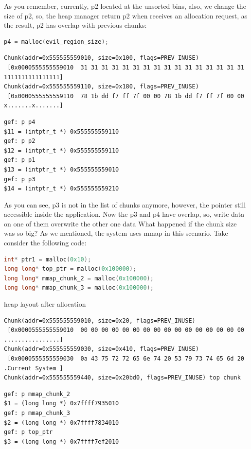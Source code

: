 \documentclass{masterthesis}
\newcommand*\ub{unsorted bins}
\begin{document}
As you remember, currently, p2 located at the \ub{}, also, we change the size of p2, so, the heap manager return p2 when receives an allocation request, as the result, p2 has overlap with previous chunks:

\begin{lstlisting}[language=c,frame=tlrb]
p4 = malloc(evil_region_size);
 \end{lstlisting}

\begin{lstlisting}[frame=tlrb]
Chunk(addr=0x555555559010, size=0x100, flags=PREV_INUSE)
 [0x0000555555559010  31 31 31 31 31 31 31 31 31 31 31 31 31 31 31 31 1111111111111111]
Chunk(addr=0x555555559110, size=0x180, flags=PREV_INUSE)
 [0x0000555555559110  78 1b dd f7 ff 7f 00 00 78 1b dd f7 ff 7f 00 00 x.......x.......]
 \end{lstlisting}

\begin{lstlisting}[frame=tlrb]
gef: p p4
$11 = (intptr_t *) 0x555555559110
gef: p p2
$12 = (intptr_t *) 0x555555559110
gef: p p1
$13 = (intptr_t *) 0x555555559010
gef: p p3
$14 = (intptr_t *) 0x555555559210
 \end{lstlisting}
 
As you can see, p3 is not in the list of chunks anymore, however, the pointer still accessible inside the application. Now the p3 and p4 have overlap, so, write data on one of them overwrite the other one data
What happened if the chunk size was so big? As we mentioned, the system uses mmap in this scenario. Take consider the following code: 

\begin{lstlisting}[language=c,frame=tlrb]
int* ptr1 = malloc(0x10);
long long* top_ptr = malloc(0x100000);
long long* mmap_chunk_2 = malloc(0x100000);
long long* mmap_chunk_3 = malloc(0x100000);
 \end{lstlisting}
 
heap layout after allocation 

\begin{lstlisting}[frame=tlrb]
Chunk(addr=0x555555559010, size=0x20, flags=PREV_INUSE)
 [0x0000555555559010  00 00 00 00 00 00 00 00 00 00 00 00 00 00 00 00 ................]
Chunk(addr=0x555555559030, size=0x410, flags=PREV_INUSE)
 [0x0000555555559030  0a 43 75 72 72 65 6e 74 20 53 79 73 74 65 6d 20 .Current System ]
Chunk(addr=0x555555559440, size=0x20bd0, flags=PREV_INUSE) top chunk
 \end{lstlisting}

\begin{lstlisting}[frame=tlrb]
gef: p mmap_chunk_2
$1 = (long long *) 0x7ffff7935010
gef: p mmap_chunk_3
$2 = (long long *) 0x7ffff7834010
gef: p top_ptr
$3 = (long long *) 0x7ffff7ef2010
 \end{lstlisting}
\end{document}
